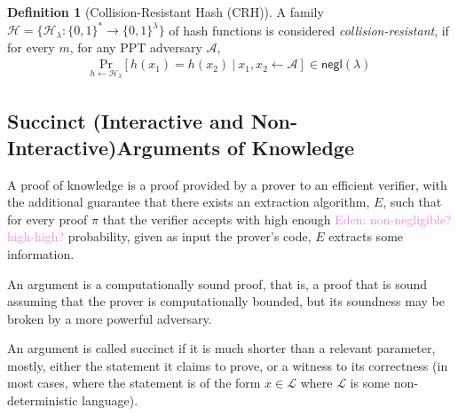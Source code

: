 \documentclass{llncs}
\numberwithin{equation}{section}
\numberwithin{figure}{section}
\theoremstyle{definition}
\newtheorem{definition}[theorem]{Definition}
\newcommand{\Enote}[1]{\textcolor{violet}{Eden: #1}}
\newcommand{\prob}[2]{\ensuremath{\underset{#1}{\text{Pr}}\left [#2\right ]}}
\newcommand{\negl}{\mathsf{negl}}
\newcommand{\Lan}{\ensuremath{\mathcal{L}}}
\begin{document}
\begin{definition} [Collision-Resistant Hash (CRH)]
    A family $\mathcal{H} = \{\mathcal{H}_\lambda: \{0,1\}^*\to\{0,1\}^\lambda\}$ of hash functions is considered \emph{collision-resistant}, if for every $m$, for any PPT adversary $\mathcal{A}$,
    \begin{gather*}
        \prob{h\leftarrow\mathcal{H}_\lambda}{h(x_1)=h(x_2)\ |\ x_1,x_2\leftarrow\mathcal{A}}\in \negl(\lambda)
    \end{gather*}
\end{definition}

\subsection{Succinct (Interactive and Non-Interactive)Arguments of Knowledge}
A proof of knowledge is a proof provided by a prover to an efficient verifier, with the additional guarantee that there exists an extraction algorithm, $E$, such that for every proof $\pi$ that the verifier accepts with high enough \Enote{non-negligible? high-high?} probability, given as input the prover's code, $E$ extracts some information.

An argument is a computationally sound proof, that is, a proof that is sound assuming that the prover is computationally bounded, but its soundness may be broken by a more powerful adversary.

An argument is called succinct if it is much shorter than a relevant parameter, mostly, either the statement it claims to prove, or a witness to its correctness (in most cases, where the statement is of the form $x\in \Lan$ where $\Lan$ is some non-deterministic language).
\end{document}
